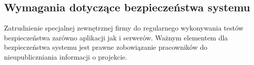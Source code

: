 \documentclass[12pt,a4paper]{report}
\begin{document}
\subsection{Wymagania dotyczące bezpieczeństwa systemu}
	Zatrudnienie specjalnej zewnętrznej firmy do regularnego wykonywania testów bezpieczeństwa zarówno aplikacji jak i serwerów. Ważnym elementem dla bezpieczeństwa systemu jest prawne zobowiązanie pracowników do nieupubliczniania informacji o projekcie.
\end{document}
